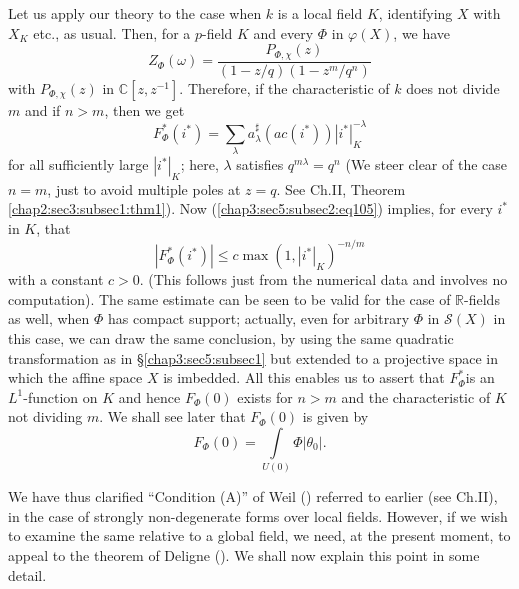 Let us apply our theory to the case when $k$ is a local field $K$,
identifying $X$ with $X_{K}$ etc., as usual. Then, for a $p$-field $K$
and every $\Phi$ in $\varphi(X)$, we have
$$
Z_{\Phi}(\omega)=\frac{P_{\Phi,\chi}(z)}{(1-z/q)(1-z^{m}/q^{n})}
$$
with $P_{\Phi,\chi}(z)$ in $\mathbb{C}[z,z^{-1}]$. Therefore, if the
characteristic of $k$ does not divide $m$ and if $n>m$, then we get
\begin{equation*}
  F^{\ast}_{\Phi}(i^{\ast})=\sum_{\lambda}a^{\sharp}_{\lambda}
  (ac(i^{\ast}))
  |i^{\ast}|^{-\lambda}_{K}\tag{105}\label{chap3:sec5:subsec2:eq105} 
\end{equation*}
for all sufficiently large $|i^{\ast}|_{K}$; here, $\lambda$ satisfies
$q^{m\lambda}=q^{n}$ (We steer clear of the case $n=m$, just to avoid
multiple poles at $z=q$. See Ch.II, Theorem
\ref{chap2:sec3:subsec1:thm1}). Now (\ref{chap3:sec5:subsec2:eq105}) 
implies, for every $i^{\ast}$ in $K$, that
\begin{equation*}
|F^{\ast}_{\Phi}(i^{\ast})|\leq c\max
(1,|i^{\ast}|_{K})^{-n/m}\tag{106}\label{chap3:sec5:subsec2:eq106}
\end{equation*}
with a constant $c>0$. (This follows just from the numerical data and
involves no computation). The same estimate can be seen to be valid
for the case of $\mathbb{R}$-fields as well, when $\Phi$ has compact
support; actually, even for arbitrary $\Phi$ in $\mathscr{S}(X)$ in this
case, we can draw the same conclusion, by using the same quadratic
transformation as in \S \ref{chap3:sec5:subsec1} but extended to a
projective space 
in which the affine space $X$ is imbedded. All this enables us to
assert that $F^{\ast}_{\Phi}$\pageoriginale is an $L^{1}$-function on
$K$ and hence 
$F_{\Phi}(0)$ exists for $n>m$ and the characteristic of $K$ not
dividing $m$. We shall see later that $F_{\Phi}(0)$ is given by
\begin{equation*}
  F_{\Phi}(0)=\int\limits_{U(0)}\Phi|\theta_{0}|.
  \tag{107}\label{chap3:sec5:subsec2:eq107} 
\end{equation*}

We have thus clarified ``Condition (A)'' of Weil (\cite{Wei 5}) referred to
earlier (see Ch.II), in the case of strongly non-degenerate forms over
local fields. However, if we wish to examine the same relative to a
global field, we need, at the present moment, to appeal to the theorem
of Deligne (\cite{Del}). We shall now explain this point in some detail.

\subsection{}\label{chap3:sec5:subsec3}%

